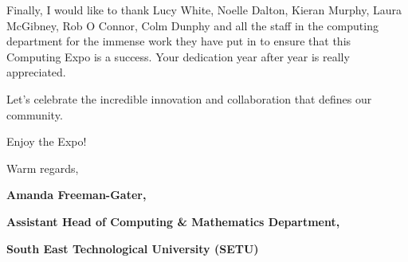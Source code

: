 \WELCOMEPARSKIP
Finally, I would like to thank Lucy White, Noelle Dalton, Kieran Murphy, Laura McGibney, Rob O Connor, Colm Dunphy and all the staff in the computing department for the immense work they have put in to ensure that this Computing Expo is a success. Your dedication year after year is really appreciated.

\WELCOMEPARSKIP
Let’s celebrate the incredible innovation and collaboration that defines our community. 

\WELCOMEPARSKIP
Enjoy the Expo!

\WELCOMEPARSKIP
Warm regards,

\vspace{-12pt}
\begin{flushright}
\textbf{Amanda Freeman-Gater,}

\textbf{Assistant Head of Computing \& Mathematics Department,}

\textbf{South East Technological University (SETU)}
\end{flushright}

\clearpage
